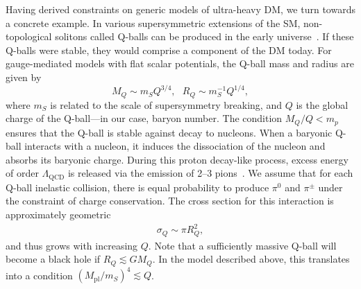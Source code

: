 Having derived constraints on generic models of ultra-heavy DM, we turn towards a concrete example.
In various supersymmetric extensions of the SM, non-topological solitons called Q-balls can be produced in the early universe~\cite{Coleman:1985ki, Kusenko:1997si}.
If these Q-balls were stable, they would comprise a component of the DM today.
For gauge-mediated models with flat scalar potentials, the Q-ball mass and radius are given by
\begin{equation}
\label{eq:Qballprop}
M_Q \sim m_S Q^{3/4}, ~~~ R_Q \sim m_S^{-1} Q^{1/4},
\end{equation}
where $m_S$ is related to the scale of supersymmetry breaking, and $Q$ is the global charge of the Q-ball---in our case, baryon number.
The condition $M_Q/Q < m_p$ ensures that the Q-ball is stable against decay to nucleons.
When a baryonic Q-ball interacts with a nucleon, it induces the dissociation of the nucleon and absorbs its baryonic charge.
During this proton decay-like process, excess energy of order $\Lambda_\text{QCD}$ is released via the emission of 2--3 pions~\cite{Kusenko:1998}.
We assume that for each Q-ball inelastic collision, there is equal probability to produce $\pi^0$ and $\pi^\pm$ under the constraint of charge conservation.
The cross section for this interaction is approximately geometric
\begin{align}
\sigma_Q \sim \pi R_Q^2,
\end{align}
and thus grows with increasing $Q$.
Note that a sufficiently massive Q-ball will become a black hole if $R_Q \lesssim G M_Q$.
In the model described above, this translates into a condition $(M_\text{pl}/m_S)^4 \lesssim Q$.

